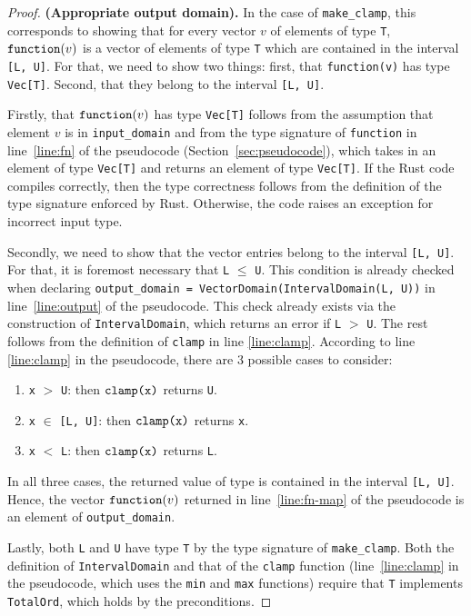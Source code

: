 \documentclass{article}
\begin{document}
\begin{proof}
\textbf{(Appropriate output domain).} In the case of \texttt{make\_clamp}, this corresponds to showing that for every vector $v$ of elements of type \texttt{T}, $\texttt{function}(v)$ is a vector of elements of type \texttt{T} which are contained in the interval \texttt{[L, U]}. For that, we need to show two things: first, that \texttt{function(v)} has type \texttt{Vec[T]}.
Second, that they belong to the interval \texttt{[L, U]}.

Firstly, that $\texttt{function}(v)$ has type \texttt{Vec[T]} follows from the assumption that element $v$ is in \texttt{input\_domain} and from the type signature of \texttt{function} in line~\ref{line:fn} of the pseudocode (Section~\ref{sec:pseudocode}), which takes in an element of type \texttt{Vec[T]} and returns an element of type \texttt{Vec[T]}. If the Rust code compiles correctly, then the type correctness follows from the definition of the type signature enforced by Rust. Otherwise, the code raises an exception for incorrect input type. 

Secondly, we need to show that the vector entries belong to the interval \texttt{[L, U]}. For that, it is foremost necessary that \texttt{L} $\leq$ \texttt{U}. This condition is already checked when declaring \texttt{output\_domain = VectorDomain(IntervalDomain(L, U))} in line~\ref{line:output} of the pseudocode. This check already exists via the construction of \texttt{IntervalDomain}, which returns an error if \texttt{L} $>$ \texttt{U}. The rest follows from the definition of \texttt{clamp} in line \ref{line:clamp}. According to line \ref{line:clamp} in the pseudocode, there are 3 possible cases to consider:
\begin{enumerate}
    \item \texttt{x} $>$ \texttt{U}: then $\texttt{clamp}\texttt{(x)}$ returns \texttt{U}.
    \item \texttt{x} $\in$ \texttt{[L, U]}: then $\texttt{clamp}\texttt{(x)}$ returns \texttt{x}.
    \item \texttt{x} $<$ \texttt{L}: then $\texttt{clamp}\texttt{(x)}$ returns \texttt{L}.
\end{enumerate}
In all three cases, the returned value of type \T is contained in the interval \texttt{[L, U]}. Hence, the vector $\texttt{function}(v)$ returned in line~\ref{line:fn-map} of the pseudocode is an element of \texttt{output\_domain}.

Lastly, both \texttt{L} and \texttt{U} have type \texttt{T} by the type signature of \texttt{make\_clamp}. Both the definition of \texttt{IntervalDomain} and that of the \texttt{clamp} function (line~\ref{line:clamp} in the pseudocode, which uses the \texttt{min} and \texttt{max} functions) require that \texttt{T} implements \texttt{TotalOrd}, which holds by the preconditions.


\end{proof}
\end{document}
